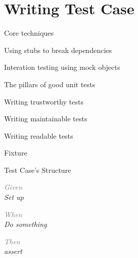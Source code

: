 \documentclass[14pt]{beamer}
\begin{document}
\section{Writing Test Case}
\begin{frame}[plain]{Core techniques}
    \begin{fullpageitemize}
        \item Using stubs to break dependencies
        \item Interation testing using mock objects
    \end{fullpageitemize}
\end{frame}

\begin{frame}[plain]{The pillars of good unit tests}
    \begin{fullpageitemize}
        \item Writing trustworthy tests
        \item Writing maintainable tests
        \item Writing readable tests
    \end{fullpageitemize}
\end{frame}

\begin{frame}[plain]{Fixture}
    \begin{fullpageitemize}
        \item {}
        \item \color{colorhgray}{Class under test}
        \item {}
        \item \color{colorhgray}{Test cases}
        \item {}
        \item \color{colorhgray}{Final test case}
        \item {}
    \end{fullpageitemize}
\end{frame}

\begin{frame}[plain]{Test Case's Structure}
    \begin{fullpageitemize}
        \item<1-> \em{\textcolor{gray}{Given}} \\
            Set up \\

        \item<2-> \em{\textcolor{gray}{When}} \\
            Do something \\

        \item<3-> \em{\textcolor{gray}{Then}} \\
            assert
    \end{fullpageitemize}
\end{frame}
\end{document}

